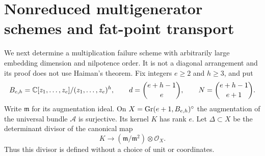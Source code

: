 \section{Nonreduced multigenerator schemes and fat-point transport}
\label{sec:nonreduced-multigenerator}
We next determine a multiplication failure scheme with arbitrarily
large embedding dimension and nilpotence order. It is not a diagonal
arrangement and its proof does not use Haiman's theorem.
Fix integers $e\ge2$ and $h\ge3$, and put
\begin{equation}\label{eq:fat-algebra}
 B_{e,h}=\mathbb C[z_1,\ldots,z_e]/(z_1,\ldots,z_e)^h,
 \qquad d=\binom{e+h-1}{e},\qquad N=\binom{e+h-1}{e+1}.
\end{equation}
Write $\mathfrak m$ for its augmentation ideal.
On $X=\operatorname{Gr}(e+1,B_{e,h})^\circ$ the augmentation of the universal
bundle $\mathcal A$ is surjective. Its kernel $K$ has rank $e$.
Let $\Delta\subset X$ be the determinant divisor of the canonical map
\begin{equation}\label{eq:fat-tangent-map}
 K\longrightarrow(\mathfrak m/\mathfrak m^2)\otimes\mathcal O_X.
\end{equation}
Thus this divisor is defined without a choice of unit or coordinates.

